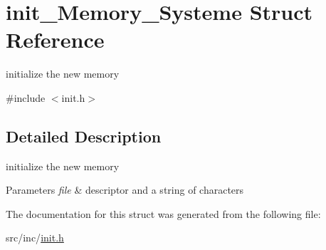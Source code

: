 \hypertarget{structinit___memory___systeme}{}\section{init\+\_\+\+Memory\+\_\+\+Systeme Struct Reference}
\label{structinit___memory___systeme}


initialize the new memory  




{\ttfamily \#include $<$init.\+h$>$}



\subsection{Detailed Description}
initialize the new memory 


\begin{DoxyParams}{Parameters}
{\em file} & descriptor and a string of characters \\
\hline
\end{DoxyParams}


The documentation for this struct was generated from the following file\+:\begin{DoxyCompactItemize}
\item 
src/inc/\mbox{\hyperlink{init_8h}{init.\+h}}\end{DoxyCompactItemize}
